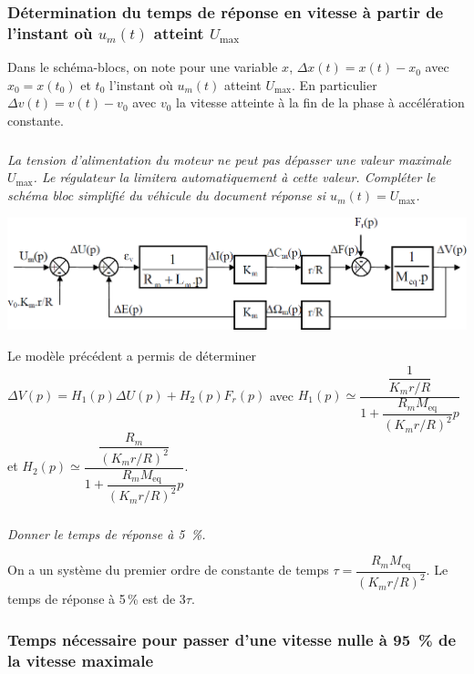 \documentclass[10pt,fleqn]{article} %
\begin{document}
\begin{multicols}{2}
\subsubsection*{Détermination du temps de réponse en vitesse à partir de l’instant où $u_m(t)$ atteint $U_{\text{max}}$}

Dans le schéma-blocs, on note pour une variable $x$, $\Delta x(t)=x(t) - x_0$ avec $x_0=x\left(t_0\right)$ et $t_0$ l’instant où $u_m(t)$
atteint $U_{\text{max}}$. En particulier $\Delta v(t) = v(t) -v_0$ avec $v_0$ la vitesse atteinte à la fin de la phase à accélération constante.

\subparagraph{}
\textit{La tension d’alimentation du moteur ne peut pas dépasser une valeur maximale $U_{\text{max}}$. Le
régulateur la limitera automatiquement à cette valeur. Compléter le schéma bloc simplifié du véhicule du
 document réponse si $u_m(t)=U_{\text{max}}$.}
\ifprof
\begin{corrige}
\begin{center}
\includegraphics[width=.95\linewidth]{images/cor_01}
\end{center}

\end{corrige}
\else
\fi

Le modèle précédent a permis de déterminer $\Delta V (p)=H_1(p)\Delta U(p)+H_2(p)F_r(p)$ avec $H_1(p)\simeq \dfrac{\dfrac{1}{K_m r / R}}{1+\dfrac{R_m M_{\text{eq}}}{\left(K_m r /R\right)^2}p}$ et $H_2(p)\simeq \dfrac{\dfrac{R_m}{\left(K_m r /R\right)^2}}{1+\dfrac{R_m M_{\text{eq}}}{\left(K_m r /R\right)^2}p}$.

\subparagraph{}
\textit{Donner le temps de réponse à 5\, \%.}

\ifprof
\begin{corrige}
On a un système du premier ordre de constante de temps $\tau = \dfrac{R_m M_{\text{eq}}}{\left(K_m r /R\right)^2}$. Le temps de réponse à 5\,\% est de $3\tau$. 
\end{corrige}
\else
\fi


\subsubsection*{Temps nécessaire pour passer d’une vitesse nulle à 95\, \% de la vitesse maximale}


\end{multicols}
\end{document}
